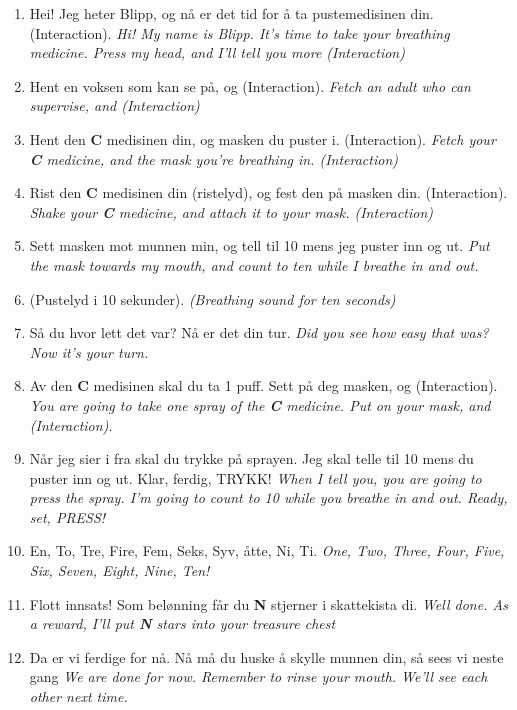 \begin{enumerate}
  \item Hei! Jeg heter Blipp, og n\r{a} er det tid for \r{a} ta pustemedisinen din.(Interaction). \emph{Hi! My name is Blipp. It's time to take your breathing medicine. Press my head, and I'll tell you more (Interaction)}
  \item Hent en voksen som kan se p\r{a}, og (Interaction). \emph{Fetch an adult who can supervise, and (Interaction)}
  \item Hent den \textbf{C} medisinen din, og masken du puster i. (Interaction). \emph{Fetch your \textbf{C} medicine, and the mask you're breathing in. (Interaction)}
  \item Rist den \textbf{C} medisinen din (ristelyd), og fest den p\r{a} masken din. (Interaction). \emph{Shake your \textbf{C} medicine, and attach it to your mask. (Interaction)}
  \item Sett masken mot munnen min, og tell til 10 mens jeg puster inn og ut. \emph{Put the mask towards my mouth, and count to ten while I breathe in and out. }
  \item (Pustelyd i 10 sekunder). \emph{(Breathing sound for ten seconds)}
  \item S\r{a} du hvor lett det var? N\r{a} er det din tur. \emph{Did you see how easy that was? Now it's your turn. }
  \item Av den \textbf{C} medisinen skal du ta 1 puff. Sett p\r{a} deg masken, og (Interaction). \emph{You are going to take one spray of the \textbf{C} medicine. Put on your mask, and (Interaction). }
  \item N\r{a}r jeg sier i fra skal du trykke p\r{a} sprayen. Jeg skal telle til 10 mens du puster inn og ut. Klar, ferdig, TRYKK! \emph{When I tell you, you are going to press the spray. I'm going to count to 10 while you breathe in and out. Ready, set, PRESS!}
  \item En, To, Tre, Fire, Fem, Seks, Syv, \r{a}tte, Ni, Ti. \emph{One, Two, Three, Four, Five, Six, Seven, Eight, Nine, Ten!}
  \item Flott innsats! Som belønning f\r{a}r du \textbf{N} stjerner i skattekista di. \emph{Well done. As a reward, I'll put \textbf{N} stars into your treasure chest} 
  \item Da er vi ferdige for n\r{a}. N\r{a} m\r{a} du huske \r{a} skylle munnen din, s\r{a} sees vi neste gang \emph{We are done for now. Remember to rinse your mouth. We'll see each other next time.}
\end{enumerate}


